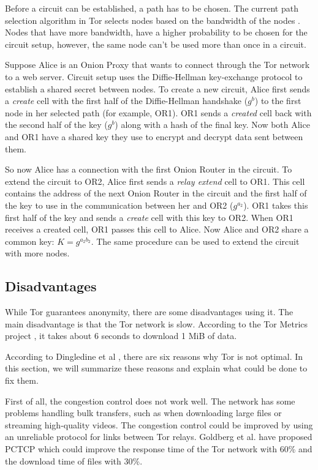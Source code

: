 \documentclass{article}
\begin{document}
		Before a circuit can be established, a path has to be chosen. The current path selection algorithm in Tor selects nodes based on the bandwidth of the nodes \cite{wang2012congestion}. Nodes that have more bandwidth, have a higher probability to be chosen for the circuit setup, however, the same node can't be used more than once in a circuit.
		
		Suppose Alice is an Onion Proxy that wants to connect through the Tor network to a web server. Circuit setup uses the Diffie-Hellman key-exchange protocol \cite{diffiehellman} to establish a shared secret between nodes. To create a new circuit, Alice first sends a \emph{create} cell with the first half of the Diffie-Hellman handshake ($ g^b $) to the first node in her selected path (for example, OR1). OR1 sends a \emph{created} cell back with the second half of the key ($ g^b $) along with a hash of the final key. Now both Alice and OR1 have a shared key they use to encrypt and decrypt data sent between them.
		
		So now Alice has a connection with the first Onion Router in the circuit. To extend the circuit to OR2, Alice first sends a \emph{relay extend} cell to OR1. This cell contains the address of the next Onion Router in the circuit and the first half of the key to use in the communication between her and OR2 ($ g^{a_2} $). OR1 takes this first half of the key and sends a \emph{create} cell with this key to OR2. When OR1 receives a created cell, OR1 passes this cell to Alice. Now Alice and OR2 share a common key: $ K = g^{a_2b_2} $. The same procedure can be used to extend the circuit with more nodes.
			
	\subsection{Disadvantages}
		\label{ss:tor_disadvantages}

		While Tor guarantees anonymity, there are some disadvantages using it. The main disadvantage is that the Tor network is slow. According to the Tor Metrics project \cite{tormetricsprojectwebsite}, it takes about 6 seconds to download 1 MiB of data.
		
		According to Dingledine et al \cite{dingledine2009performance}, there are six reasons why Tor is not optimal. In this section, we will summarize these reasons and explain what could be done to fix them.
		
		First of all, the congestion control does not work well. The network has some problems handling bulk transfers, such as when downloading large files or streaming high-quality videos. The congestion control could be improved by using an unreliable protocol for links between Tor relays. Goldberg et al. \cite{alsabah2013pctcp} have proposed PCTCP which could improve the response time of the Tor network with 60\% and the download time of files with 30\%.	
		
\end{document}
